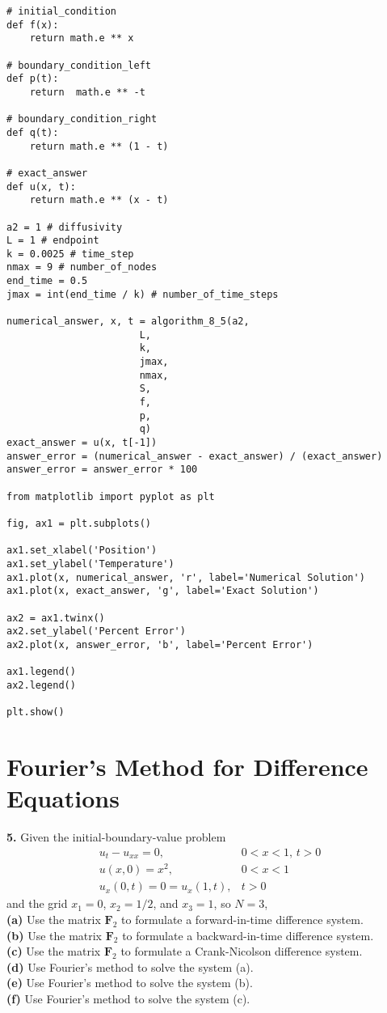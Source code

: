 \documentclass{amsbook}%
\theoremstyle{plain}
\numberwithin{equation}{section}
\begin{document}
\begin{small}
\begin{verbatim}
# initial_condition
def f(x):
    return math.e ** x

# boundary_condition_left
def p(t):
    return  math.e ** -t

# boundary_condition_right
def q(t):
    return math.e ** (1 - t)

# exact_answer	
def u(x, t):
	return math.e ** (x - t)

a2 = 1 # diffusivity
L = 1 # endpoint
k = 0.0025 # time_step
nmax = 9 # number_of_nodes
end_time = 0.5
jmax = int(end_time / k) # number_of_time_steps

numerical_answer, x, t = algorithm_8_5(a2,
                       L,
                       k,
                       jmax,
                       nmax,
                       S,
                       f,
                       p,
                       q)
exact_answer = u(x, t[-1])
answer_error = (numerical_answer - exact_answer) / (exact_answer)
answer_error = answer_error * 100

from matplotlib import pyplot as plt

fig, ax1 = plt.subplots()

ax1.set_xlabel('Position')
ax1.set_ylabel('Temperature')
ax1.plot(x, numerical_answer, 'r', label='Numerical Solution')
ax1.plot(x, exact_answer, 'g', label='Exact Solution')

ax2 = ax1.twinx()
ax2.set_ylabel('Percent Error')
ax2.plot(x, answer_error, 'b', label='Percent Error')

ax1.legend()
ax2.legend()

plt.show()
\end{verbatim}
\end{small}

	\section{Fourier's Method for Difference Equations}
	
		\noindent\textbf{5.} Given the initial-boundary-value problem
		\begin{align}
			u_t-u_{xx}=0, & 0<x<1,\, t>0\\
			u(x,0)=x^2, & 0<x<1\\
			u_x(0,t)=0=u_x(1,t), & t>0
		\end{align}
		and the grid $x_1=0$, $x_2=1/2$, and $x_3=1$, so $N=3$,\\
		\textbf{(a)} Use the matrix $\mathbf{F}_2$ to formulate a forward-in-time difference system.\\
		\textbf{(b)} Use the matrix $\mathbf{F}_2$ to formulate a backward-in-time difference system.\\
		\textbf{(c)} Use the matrix $\mathbf{F}_2$ to formulate a Crank-Nicolson difference system.\\
		\textbf{(d)} Use Fourier's method to solve the system (a).\\
		\textbf{(e)} Use Fourier's method to solve the system (b).\\
		\textbf{(f)} Use Fourier's method to solve the system (c).\\[12pt]	
		
\end{document}
